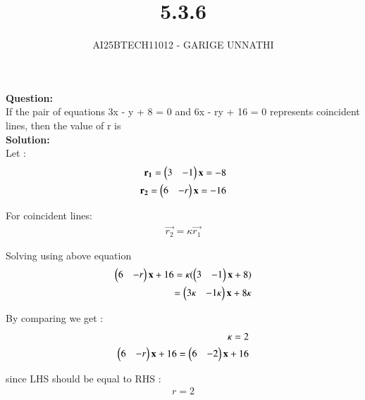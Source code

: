 \documentclass[journal]{IEEEtran}
\begin{document}

\vspace{3cm}

\title{5.3.6}
\author{AI25BTECH11012 - GARIGE UNNATHI}
{\let\newpage\relax\maketitle}


\renewcommand{\thefigure}{\theenumi}
\renewcommand{\thetable}{\theenumi}
\setlength{\intextsep}{10pt} %


\renewcommand{\thetable}{\theenumi}


\textbf{Question:}\\
If the pair of equations 3x - y + 8 = 0 and 6x - ry + 16 = 0 represents coincident
lines, then the value of r is  \\

\textbf{Solution:}\\
Let :
\begin{align}
    \mathbf{r_1} = \begin{pmatrix}3 & -1 \end{pmatrix}\mathbf{x} = -8 \\
    \mathbf{r_2} = \begin{pmatrix}6 & -r\end{pmatrix}\mathbf{x} = -16
\end{align}

For coincident lines:
\begin{align}
    \vec{r_2} = \kappa  \vec{r_1}
\end{align}

Solving using above equation 
\begin{align}
    \begin{pmatrix}6 & -r\end{pmatrix}\mathbf{x} + 16 = \kappa(\begin{pmatrix}3 & -1 \end{pmatrix}\mathbf{x} + 8)\\
     = \begin{pmatrix}3\kappa & -1\kappa \end{pmatrix}\mathbf{x} + 8\kappa
\end{align}

By comparing we get :
\begin{align}
    \kappa = 2\\
     \begin{pmatrix}6 & -r\end{pmatrix}\mathbf{x} + 16 = \begin{pmatrix}6 & -2 \end{pmatrix}\mathbf{x} + 16
\end{align}

since LHS should be equal to RHS :
\begin{align}
    r = 2
\end{align}
\end{document}
